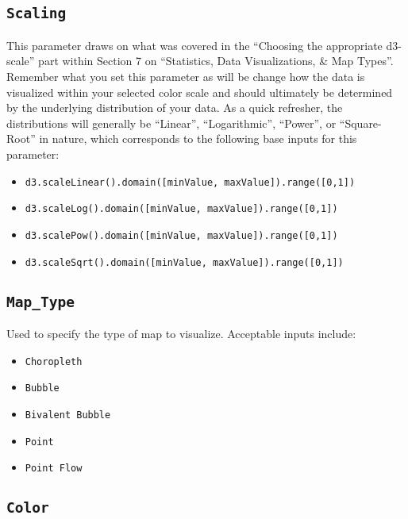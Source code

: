\documentclass[
]{krantz}
\providecommand{\tightlist}{%
  \setlength{\itemsep}{0pt}\setlength{\parskip}{0pt}}
\begin{document}
\hypertarget{scaling}{%
\subsection*{\texorpdfstring{\texttt{Scaling}}{Scaling}}\label{scaling}}


This parameter draws on what was covered in the ``Choosing the appropriate d3-scale'' part within Section 7 on ``Statistics, Data Visualizations, \& Map Types''. Remember what you set this parameter as will be change how the data is visualized within your selected color scale and should ultimately be determined by the underlying distribution of your data. As a quick refresher, the distributions will generally be ``Linear'', ``Logarithmic'', ``Power'', or ``Square-Root'' in nature, which corresponds to the following base inputs for this parameter:

\begin{itemize}
\tightlist
\item
  \texttt{d3.scaleLinear().domain({[}minValue,\ maxValue{]}).range({[}0,1{]})}
\item
  \texttt{d3.scaleLog().domain({[}minValue,\ maxValue{]}).range({[}0,1{]})}
\item
  \texttt{d3.scalePow().domain({[}minValue,\ maxValue{]}).range({[}0,1{]})}
\item
  \texttt{d3.scaleSqrt().domain({[}minValue,\ maxValue{]}).range({[}0,1{]})}
\end{itemize}

\hypertarget{map_type}{%
\subsection*{\texorpdfstring{\texttt{Map\_Type}}{Map\_Type}}\label{map_type}}


Used to specify the type of map to visualize. Acceptable inputs include:

\begin{itemize}
\tightlist
\item
  \texttt{Choropleth}
\item
  \texttt{Bubble}
\item
  \texttt{Bivalent\ Bubble}
\item
  \texttt{Point}
\item
  \texttt{Point\ Flow}
\end{itemize}

\hypertarget{color}{%
\subsection*{\texorpdfstring{\texttt{Color}}{Color}}\label{color}}
\end{document}
